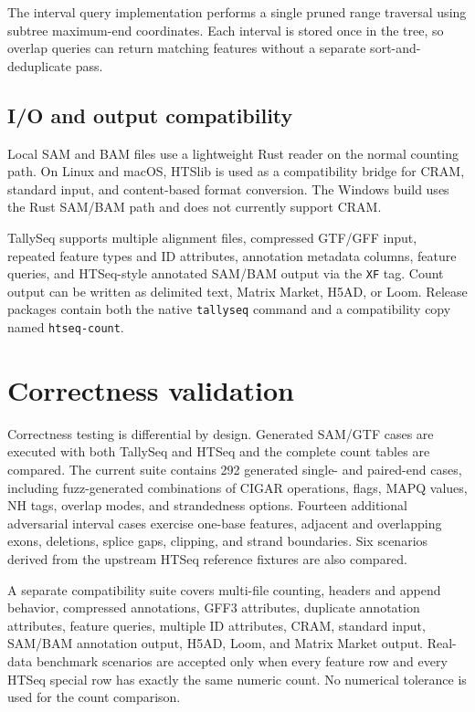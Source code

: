 \documentclass[11pt]{article}
\begin{document}
The interval query implementation performs a single pruned range traversal using subtree maximum-end coordinates. Each interval is stored once in the tree, so overlap queries can return matching features without a separate sort-and-deduplicate pass.

\subsection{I/O and output compatibility}

Local SAM and BAM files use a lightweight Rust reader on the normal counting path. On Linux and macOS, HTSlib is used as a compatibility bridge for CRAM, standard input, and content-based format conversion. The Windows build uses the Rust SAM/BAM path and does not currently support CRAM.

TallySeq supports multiple alignment files, compressed GTF/GFF input, repeated feature types and ID attributes, annotation metadata columns, feature queries, and HTSeq-style annotated SAM/BAM output via the \texttt{XF} tag. Count output can be written as delimited text, Matrix Market, H5AD, or Loom. Release packages contain both the native \texttt{tallyseq} command and a compatibility copy named \texttt{htseq-count}.

\section{Correctness validation}

Correctness testing is differential by design. Generated SAM/GTF cases are executed with both TallySeq and HTSeq and the complete count tables are compared. The current suite contains 292 generated single- and paired-end cases, including fuzz-generated combinations of CIGAR operations, flags, MAPQ values, NH tags, overlap modes, and strandedness options. Fourteen additional adversarial interval cases exercise one-base features, adjacent and overlapping exons, deletions, splice gaps, clipping, and strand boundaries. Six scenarios derived from the upstream HTSeq reference fixtures are also compared.

A separate compatibility suite covers multi-file counting, headers and append behavior, compressed annotations, GFF3 attributes, duplicate annotation attributes, feature queries, multiple ID attributes, CRAM, standard input, SAM/BAM annotation output, H5AD, Loom, and Matrix Market output. Real-data benchmark scenarios are accepted only when every feature row and every HTSeq special row has exactly the same numeric count. No numerical tolerance is used for the count comparison.
\end{document}
